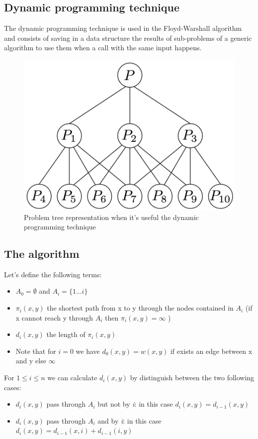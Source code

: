 \documentclass[10pt,a4paper]{book}
\begin{document}
		\subsection{Dynamic programming technique}
		The dynamic programming technique is used in the Floyd-Warshall algorithm and consists of saving in a data structure the results of sub-problems of a generic algorithm to use them when a call with the same input happens.
		\begin{figure}
			\centering
			\includegraphics[width=0.5\linewidth]{img/DeepinScreenshot_20180222212118}
			\caption{Problem tree representation when it's useful the dynamic programming technique}
			\label{fig:deepinscreenshot20180222212118}
		\end{figure}
		\subsection{The algorithm}
		Let's define the following terms:
		\begin{itemize}
			\item $ A_0 = \emptyset $ and $ A_i = \{1 \dots i \} $
			\item $ \pi_i(x,y) $ the shortest path from x to y through the nodes contained in $ A_i $ (if x cannot reach y through $ A_i $ then $  \pi_i(x,y) = \infty $ )
			\item  $ d_i(x,y) $ the length of $ \pi_i(x,y) $
			\item Note that for $ i = 0 $ we have $ d_0(x,y) = w(x,y) $ if exists an edge between x and y else $ \infty $
		\end{itemize}
		For $ 1 \leq i \leq n $ we can calculate $ d_i(x,y) $ by distinguish between the two following cases:
		\begin{itemize}
			\item $ d_i(x,y)  $ pass through $ A_i $ but not by \textit{i}: in this case $ d_i(x,y) = d_{i-1}(x,y) $
			\item $ d_i(x,y)  $ pass through $ A_i $ and by \textit{i}: in this case $ d_i(x,y) = d_{i-1}(x,i) + d_{i-1}(i, y) $
		\end{itemize}
\end{document}
